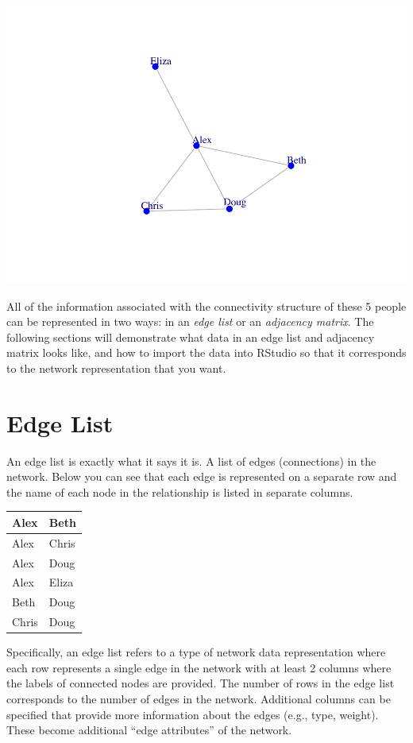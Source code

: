 \documentclass[
]{book}
\begin{document}
\includegraphics{bookdown-demo_files/figure-latex/unnamed-chunk-73-1.pdf}

All of the information associated with the connectivity structure of these 5 people can be represented in two ways: in an \emph{edge list} or an \emph{adjacency matrix}. The following sections will demonstrate what data in an edge list and adjacency matrix looks like, and how to import the data into RStudio so that it corresponds to the network representation that you want.

\section{Edge List}\label{edge-list}

An edge list is exactly what it says it is. A list of edges (connections) in the network. Below you can see that each edge is represented on a separate row and the name of each node in the relationship is listed in separate columns.

\begin{table}
\centering
\begin{tabular}{l|l}
\hline
Alex & Beth\\
\hline
Alex & Chris\\
\hline
Alex & Doug\\
\hline
Alex & Eliza\\
\hline
Beth & Doug\\
\hline
Chris & Doug\\
\hline
\end{tabular}
\end{table}

Specifically, an edge list refers to a type of network data representation where each row represents a single edge in the network with at least 2 columns where the labels of connected nodes are provided. The number of rows in the edge list corresponds to the number of edges in the network. Additional columns can be specified that provide more information about the edges (e.g., type, weight). These become additional ``edge attributes'' of the network.
\end{document}
